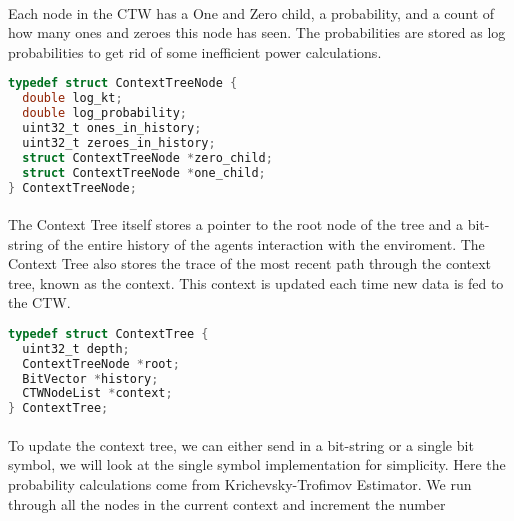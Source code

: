 \documentclass[fancychapters]{report}   	%
\begin{document}
\paragraph{}Each node in the CTW has a One and Zero child, a probability, and a count of how many ones and zeroes this node has seen. The probabilities are stored as log probabilities to get rid of some inefficient power calculations.

\begin{lstlisting}[language=C]
typedef struct ContextTreeNode {
  double log_kt;
  double log_probability;
  uint32_t ones_in_history;
  uint32_t zeroes_in_history;
  struct ContextTreeNode *zero_child;
  struct ContextTreeNode *one_child;
} ContextTreeNode;
\end{lstlisting}

\paragraph{}The Context Tree itself stores a pointer to the root node of the tree and a bit-string of the entire history of the agents interaction with the enviroment.  The Context Tree also stores the trace of the most recent path through the context tree, known as the context. This context is updated each time new data is fed to the CTW.

\begin{lstlisting}[language=C]
typedef struct ContextTree {
  uint32_t depth;
  ContextTreeNode *root;
  BitVector *history;
  CTWNodeList *context;
} ContextTree;
\end{lstlisting}

\paragraph{}To update the context tree, we can either send in a bit-string or a single bit symbol, we will look at the single symbol implementation for simplicity. Here the probability calculations come from Krichevsky-Trofimov Estimator. We run through all the nodes in the current context and increment the number
\end{document}
